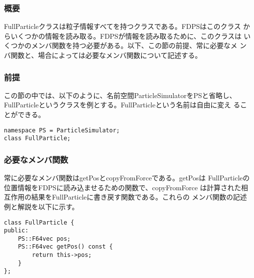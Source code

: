 \subsubsection{概要}

FullParticleクラスは粒子情報すべてを持つクラスである。FDPSはこのクラス
からいくつかの情報を読み取る。FDPSが情報を読み取るために、このクラスは
いくつかのメンバ関数を持つ必要がある。以下、この節の前提、常に必要なメ
ンバ関数と、場合によっては必要なメンバ関数について記述する。

\subsubsection{前提}

この節の中では、以下のように、名前空間ParticleSimulatorをPSと省略し、
FullParticleというクラスを例とする。FullParticleという名前は自由に変え
ることができる。
\begin{screen}
\begin{verbatim}
namespace PS = ParticleSimulator;
class FullParticle;
\end{verbatim}
\end{screen}

\subsubsection{必要なメンバ関数}


常に必要なメンバ関数はgetPosとcopyFromForceである。getPosは
FullParticleの位置情報をFDPSに読み込ませるための関数で、copyFromForce
は計算された相互作用の結果をFullParticleに書き戻す関数である。これらの
メンバ関数の記述例と解説を以下に示す。


\begin{screen}
\begin{verbatim}
class FullParticle {
public:
    PS::F64vec pos;
    PS::F64vec getPos() const {
        return this->pos;
    }
};
\end{verbatim}
\end{screen}

